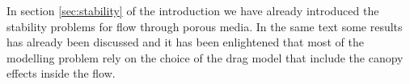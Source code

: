 In section \ref{sec:stability} of the introduction we have already introduced the stability problems for flow through porous media.
In the same text some results has already been discussed and it has been enlightened that most of the modelling problem rely on the choice of the drag model that include the canopy effects inside the flow.

